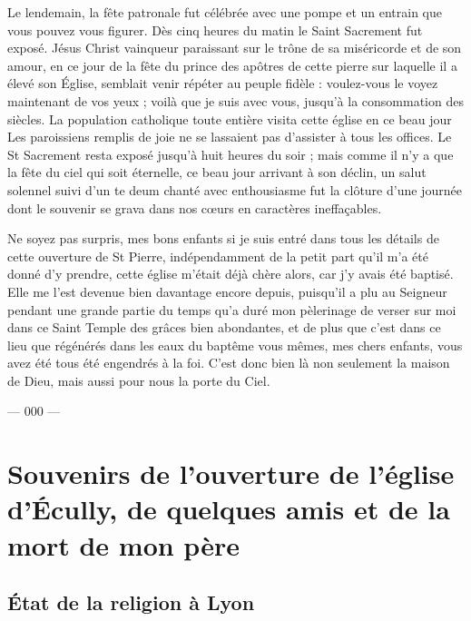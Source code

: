 \documentclass[11pt,a4paper]{report}
\begin{document}
Le lendemain, la fête patronale fut célébrée avec une pompe et un entrain que vous pouvez vous figurer. Dès cinq heures du matin le Saint Sacrement fut exposé. Jésus Christ vainqueur paraissant sur le trône de sa miséricorde et de son amour, en ce jour de la fête du prince des apôtres de cette pierre sur laquelle il a élevé son Église, semblait venir répéter au peuple fidèle : voulez-vous le voyez maintenant de vos yeux ; voilà que je suis avec vous, jusqu'à la consommation des siècles. La population catholique toute entière visita cette église en ce beau jour Les paroissiens remplis de joie ne se lassaient pas d'assister à tous les offices. Le St Sacrement resta exposé jusqu'à huit heures du soir ; mais comme il n'y a que la fête du ciel qui soit éternelle, ce beau jour arrivant à son déclin, un salut solennel suivi d'un te deum chanté avec enthousiasme fut la clôture d'une journée dont le souvenir se grava dans nos cœurs en caractères ineffaçables.

Ne soyez pas surpris, mes bons enfants si je suis entré dans tous les détails de cette ouverture de St Pierre, indépendamment de la petit part qu'il m'a été donné d'y prendre, cette église m'était déjà chère alors, car j'y avais été baptisé. Elle me l'est devenue bien davantage encore depuis, puisqu'il a plu au Seigneur pendant une grande partie du temps qu'a duré mon pèlerinage de verser sur moi dans ce Saint Temple des grâces bien abondantes, et de plus que c'est dans ce lieu que régénérés dans les eaux du baptême vous mêmes, mes chers enfants, vous avez été tous été engendrés à la foi. C'est donc bien là non seulement la maison de Dieu, mais aussi pour nous la porte du Ciel.

\vspace{1cm}

\begin{center}
--- 000 ---
\end{center}

\chapter{Souvenirs de l'ouverture de l'église d'Écully, de quelques amis et de la mort de mon père}

\section*{État de la religion à Lyon}
\end{document}
